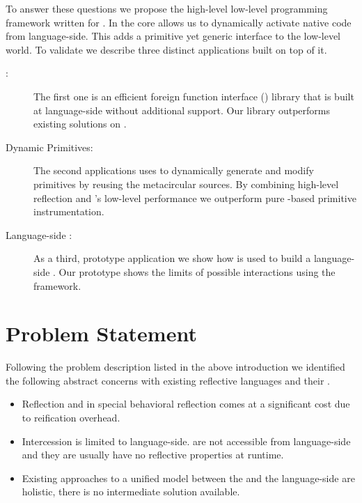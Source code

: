 To answer these questions we propose the high-level low-level programming framework \B written for \PH.
In the core \B allows us to dynamically activate native code from language-side.
This adds a primitive yet generic interface to the low-level \VM world.
To validate \B we describe three distinct applications built on top of it.
%
\begin{description}
	\item[\FFI:] The first one is an efficient foreign function interface (\FFI) library that is built at language-side without additional \VM support.
	Our \FFI library outperforms existing solutions on \PH.
	
	\item[Dynamic Primitives:] The second applications uses \B to dynamically generate and modify \PH primitives by reusing the metacircular \VM sources.
	By combining high-level reflection and \B's low-level performance we outperform pure \PH-based primitive instrumentation.
	
	\item[Language-side \JIT:] As a third, prototype application we show how \B is used to build a language-side \JIT.
	Our prototype shows the limits of possible \VM interactions using the \B framework. 
\end{description}


\section{Problem Statement}
Following the problem description listed in the above introduction we identified the following abstract concerns with existing reflective languages and their \VMs.
%
\begin{itemize}
	\item Reflection and in special behavioral reflection comes at a significant cost due to reification overhead.
		
	\item Intercession is limited to language-side.
	\VMs are not accessible from language-side and they are usually have no reflective properties at runtime. 
	
	\item Existing approaches to a unified model between the \VM and the language-side are holistic, there is no intermediate solution available.
\end{itemize}

